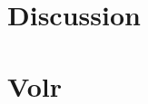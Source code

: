 \documentclass[a4paper,oneside]{memoir}
\begin{document}
\chapter{Discussion} \label{sec:discussion}

\printbibliography
\printglossary
\printindex

\appendix
\chapter{Volr} \label{appendix:volr}
  
\end{document}
